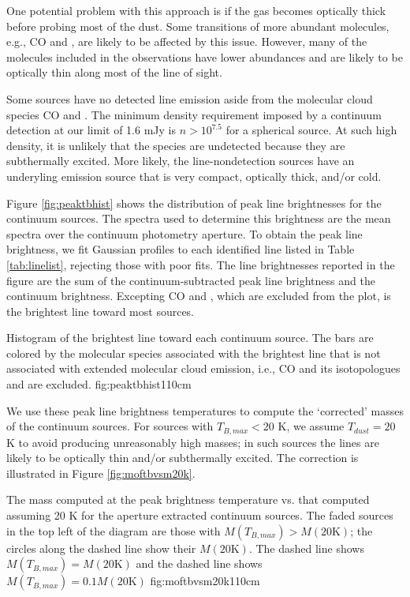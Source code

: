 \documentclass{aa}
\begin{document}
One potential problem with this approach is if the gas becomes optically thick
before probing most of the dust.  Some transitions of more abundant molecules,
e.g., CO and \formaldehyde, are likely to be affected by this issue.  However,
many of the molecules included in the observations have lower abundances and
are likely to be optically thin along most of the line of sight.

Some sources have no detected line emission aside from the molecular cloud
species CO and \formaldehyde.  The minimum density requirement imposed by a
continuum detection at our limit of 1.6 mJy is $n>10^{7.5}$ \percc for a
spherical source.  At such high density, it is unlikely that the species are
undetected because they are subthermally excited.  More likely, the
line-nondetection sources have an underyling emission source that is very
compact, optically thick, and/or cold.

Figure \ref{fig:peaktbhist} shows the distribution of peak line brightnesses
for the continuum sources.  The spectra used to determine this brightness are
the mean spectra over the continuum photometry aperture.  To obtain the peak
line brightness, we fit Gaussian profiles to each identified line listed in
Table \ref{tab:linelist}, rejecting those with poor fits.  The line
brightnesses reported in the figure are the sum of the continuum-subtracted
peak line brightness and the continuum brightness.  Excepting CO and
\formaldehyde, which are excluded from the plot, \methanol is the brightest
line toward most sources. 

{Histogram of the brightest line toward each continuum source.
The bars are colored by the molecular species associated with the brightest
line that is not associated with extended molecular cloud emission,
i.e., CO and its isotopologues and \formaldehyde are excluded.}
{fig:peaktbhist}{1}{10cm}

We use these peak line brightness temperatures to compute the `corrected'
masses of the continuum sources.  For sources with $T_{B,max} < 20$ K, we
assume $T_{dust} = 20$ K to avoid producing unreasonably high masses; in such
sources the lines are likely to be optically thin and/or subthermally excited.
The correction is illustrated in Figure \ref{fig:moftbvsm20k}.

{The mass computed at the peak brightness temperature vs. that computed
assuming 20 K  for the aperture extracted continuum sources.
The faded sources in the top left of the diagram are those with $M(T_{B,max}) >
M(20\textrm{K})$; the circles along the dashed line show their $M(20\mathrm{K})$.
The dashed line shows $M(T_{B,max}) =
M(20\textrm{K})$ and the dashed line shows $M(T_{B,max}) = 0.1 
M(20\textrm{K})$ 
}{fig:moftbvsm20k}{1}{10cm}
\end{document}
